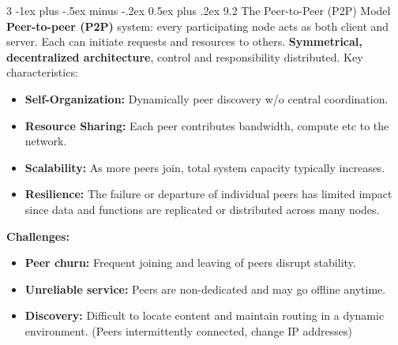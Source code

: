 \documentclass[a4paper, 9pt, landscape]{article}
\makeatletter
\renewcommand{\subsection}{\@startsection{subsubsection}{3}{0mm}%
                                {-1ex plus -.5ex minus -.2ex}%
                                {0.5ex plus .2ex}%
                                {\normalfont\small\bfseries}}
\makeatother
\begin{document}
\begin{multicols*}{3}
\subsection{9.2 The Peer-to-Peer (P2P) Model}
\textbf{Peer-to-peer (P2P)} system: every participating node acts as both client and server. Each can initiate requests and resources to others. 
\textbf{Symmetrical, decentralized architecture}, control and responsibility distributed. Key characteristics:
\begin{itemize}
    \item \textbf{Self-Organization:} Dynamically peer discovery w/o central coordination.
    \item \textbf{Resource Sharing:} Each peer contributes bandwidth, compute etc to the network.
    \item \textbf{Scalability:} As more peers join, total system capacity typically increases.
    \item \textbf{Resilience:} The failure or departure of individual peers has limited impact since data and functions are replicated or distributed across many nodes.
\end{itemize}

\textbf{Challenges:}
\begin{itemize}
    \item \textbf{Peer churn:} Frequent joining and leaving of peers disrupt stability.
    \item \textbf{Unreliable service:} Peers are non-dedicated and may go offline anytime.
    \item \textbf{Discovery:} Difficult to locate content and maintain routing in a dynamic environment. (Peers intermittently connected, change IP addresses)
\end{itemize}


\end{multicols*}
\end{document}
